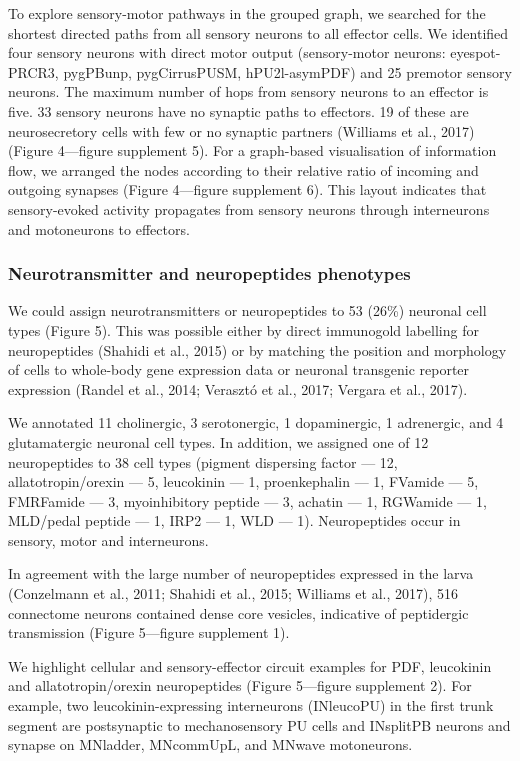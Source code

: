 \documentclass[
  11pt,
]{article}
\begin{document}
To explore sensory-motor pathways in the grouped graph, we searched for
the shortest directed paths from all sensory neurons to all effector
cells. We identified four sensory neurons with direct motor output
(sensory-motor neurons: eyespot-PRCR3, pygPBunp, pygCirrusPUSM,
hPU2l-asymPDF) and 25 premotor sensory neurons. The maximum number of
hops from sensory neurons to an effector is five. 33 sensory neurons
have no synaptic paths to effectors. 19 of these are neurosecretory
cells with few or no synaptic partners (Williams et al., 2017) (Figure
4---figure supplement 5). For a graph-based visualisation of information
flow, we arranged the nodes according to their relative ratio of
incoming and outgoing synapses (Figure 4---figure supplement 6). This
layout indicates that sensory-evoked activity propagates from sensory
neurons through interneurons and motoneurons to effectors.

\subsubsection{Neurotransmitter and neuropeptides
phenotypes}\label{neurotransmitter-and-neuropeptides-phenotypes}

We could assign neurotransmitters or neuropeptides to 53 (26\%) neuronal
cell types (Figure 5). This was possible either by direct immunogold
labelling for neuropeptides (Shahidi et al., 2015) or by matching the
position and morphology of cells to whole-body gene expression data or
neuronal transgenic reporter expression (Randel et al., 2014; Verasztó
et al., 2017; Vergara et al., 2017).

We annotated 11 cholinergic, 3 serotonergic, 1 dopaminergic, 1
adrenergic, and 4 glutamatergic neuronal cell types. In addition, we
assigned one of 12 neuropeptides to 38 cell types (pigment dispersing
factor --- 12, allatotropin/orexin --- 5, leucokinin --- 1,
proenkephalin --- 1, FVamide --- 5, FMRFamide --- 3, myoinhibitory
peptide --- 3, achatin --- 1, RGWamide --- 1, MLD/pedal peptide --- 1,
IRP2 --- 1, WLD --- 1). Neuropeptides occur in sensory, motor and
interneurons.

In agreement with the large number of neuropeptides expressed in the
larva (Conzelmann et al., 2011; Shahidi et al., 2015; Williams et al.,
2017), 516 connectome neurons contained dense core vesicles, indicative
of peptidergic transmission (Figure 5---figure supplement 1).

We highlight cellular and sensory-effector circuit examples for PDF,
leucokinin and allatotropin/orexin neuropeptides (Figure 5---figure
supplement 2). For example, two leucokinin-expressing interneurons
(INleucoPU) in the first trunk segment are postsynaptic to
mechanosensory PU cells and INsplitPB neurons and synapse on MNladder,
MNcommUpL, and MNwave motoneurons.
\end{document}
